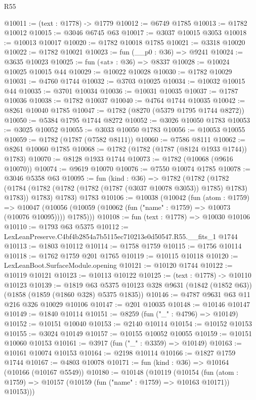 \begin{lexlean}{R55}
\begin{coremodule}
@10011 := (text : @1778) -> @1779
@10012 := @6749 @1785
@10013 := @1782 @10012
@10015 := @3046 @6745 @63
@10017 := @3037 @10015 @3053
@10018 := @10013 @10017
@10020 := @1782 @10018 @1785
@10021 := @3318 @10020
@10022 := @1782 @10021
@10023 := fun (__p0 : @36) => @9241
@10024 := @3635 @10023
@10025 := fun («at» : @36) => @8337
@10028 := @10024 @10025 @10015 @44
@10029 := @10022 @10028
@10030 := @1782 @10029
@10031 := @4760 @1744
@10032 := @3703 @10025
@10034 := @10032 @10015 @44
@10035 := @3701 @10034
@10036 := @10031 @10035
@10037 := @1787 @10036
@10038 := @1782 @10037
@10040 := @4764 @1744 @10035
@10042 := @8261 @10040 @1785
@10047 := @1782 (@8270 (@5379 @1795 @1744 @8272))
@10050 := @5384 @1795 @1744 @8272
@10052 := @3026 @10050 @1783
@10053 := @3025 @10052
@10055 := @3033 @10050 @1783
@10056 := @10053 @10055
@10059 := @1782 (@1787 (@7582 @8111))
@10060 := @7586 @8111
@10062 := @8261 @10060 @1785
@10068 := @1782 (@1782 (@1787 (@8124 @1933 @1744)) @1783)
@10070 := @8128 @1933 @1744
@10073 := @1782 (@10068 (@9616 @10070))
@10074 := @9619 @10070
@10076 := @7550 @10074 @1785
@10078 := @3046 @5358 @63
@10095 := fun (kind : @36) =>
  @1782
    (@1782
      (@1782 (@1784 (@1782 (@1782 (@1782 (@1787 (@3037 @10078 @3053)) @1785) @1783) @1783)) @1783)
      @1783)
    @1783
@10106 := @10038
    (@10042
      (fun (atom : @1759) =>
      @10047 (@10056 (@10059 (@10062 (fun ("name" : @1759) => @10073 (@10076 @10095)))) @1785)))
@10108 := fun (text : @1778) => @10030 @10106
@10110 := @1793 @63 @5375
@10112 := LexLeanPreserve.C4bf4b2854a7b5115ec710213e0d50547.R55.__fits_1 @1744
@10113 := @1803 @10112
@10114 := @1758 @1759
@10115 := @1756 @10114
@10118 := @1762 @1759 @201 @1765
@10119 := @10115 @10118
@10120 := LexLeanBoot.SurfaceModule.opening
@10121 := @10120 @1744
@10122 := @10119 @10121
@10123 := @10113 @10122
@10125 := (text : @1778) -> @10110 @10123
@10139 := @1819
    @63
    @5375
    @10123
    @328
    @9631
    (@1842 (@1852 @63))
    (@1858 (@1859 (@1860 @328) @5375 @1835))
@10146 := @4787 @9631 @63 @11 @216 @326 @10029 @10106
@10147 := @201 @10035
@10148 := @10146 @10147
@10149 := @1840 @10114
@10151 := @8259 (fun ("_" : @4796) => @10149)
@10152 := @10151 @10040
@10153 := @2140 @10114
@10154 := @10152 @10153
@10155 := @3024 @10149
@10157 := @10155 @10052 @10055
@10159 := @10151 @10060 @10153
@10161 := @3917 (fun ("_" : @3359) => @10149)
@10163 := @10161 @10074 @10153
@10164 := @2198 @10114
@10166 := @1827 @1759 @1744
@10167 := @4803 @10078
@10171 := fun (kind : @36) => @10164 (@10166 (@10167 @5549))
@10180 := @10148
    (@10119
      (@10154
        (fun (atom : @1759) => @10157 (@10159 (fun ("name" : @1759) => @10163 @10171)) @10153)))

\end{coremodule}
\end{lexlean}
